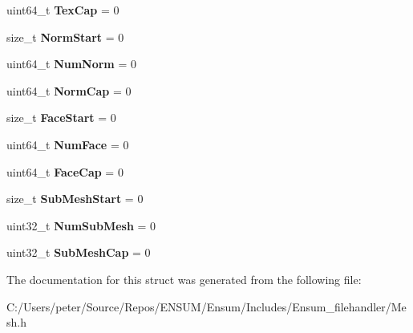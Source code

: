 \begin{DoxyCompactItemize}
\item 
uint64\+\_\+t {\bfseries Tex\+Cap} = 0\hypertarget{struct_ensum_1_1_file_handler_1_1_data_af059fdca4c5e605469d24a352457836b}{}\label{struct_ensum_1_1_file_handler_1_1_data_af059fdca4c5e605469d24a352457836b}

\item 
size\+\_\+t {\bfseries Norm\+Start} = 0\hypertarget{struct_ensum_1_1_file_handler_1_1_data_a21e21a6140afcd63a863e1bba14af522}{}\label{struct_ensum_1_1_file_handler_1_1_data_a21e21a6140afcd63a863e1bba14af522}

\item 
uint64\+\_\+t {\bfseries Num\+Norm} = 0\hypertarget{struct_ensum_1_1_file_handler_1_1_data_ae77b523ff54c96e5629333055448d3f1}{}\label{struct_ensum_1_1_file_handler_1_1_data_ae77b523ff54c96e5629333055448d3f1}

\item 
uint64\+\_\+t {\bfseries Norm\+Cap} = 0\hypertarget{struct_ensum_1_1_file_handler_1_1_data_aa96045841a19dbd3ac8736a5e880cf5a}{}\label{struct_ensum_1_1_file_handler_1_1_data_aa96045841a19dbd3ac8736a5e880cf5a}

\item 
size\+\_\+t {\bfseries Face\+Start} = 0\hypertarget{struct_ensum_1_1_file_handler_1_1_data_a45d3e0eaf6fd5ad49af3fdbd6657b833}{}\label{struct_ensum_1_1_file_handler_1_1_data_a45d3e0eaf6fd5ad49af3fdbd6657b833}

\item 
uint64\+\_\+t {\bfseries Num\+Face} = 0\hypertarget{struct_ensum_1_1_file_handler_1_1_data_a3632d1f001f1fc2b5ecf5292cd8718c2}{}\label{struct_ensum_1_1_file_handler_1_1_data_a3632d1f001f1fc2b5ecf5292cd8718c2}

\item 
uint64\+\_\+t {\bfseries Face\+Cap} = 0\hypertarget{struct_ensum_1_1_file_handler_1_1_data_a87c890385fe815e43118ec0d1ab24b42}{}\label{struct_ensum_1_1_file_handler_1_1_data_a87c890385fe815e43118ec0d1ab24b42}

\item 
size\+\_\+t {\bfseries Sub\+Mesh\+Start} = 0\hypertarget{struct_ensum_1_1_file_handler_1_1_data_aa6fdc83dbb873fdf3b74bc8c4b34ece5}{}\label{struct_ensum_1_1_file_handler_1_1_data_aa6fdc83dbb873fdf3b74bc8c4b34ece5}

\item 
uint32\+\_\+t {\bfseries Num\+Sub\+Mesh} = 0\hypertarget{struct_ensum_1_1_file_handler_1_1_data_a9fda99de4f97623374cb5f4a79cedcc6}{}\label{struct_ensum_1_1_file_handler_1_1_data_a9fda99de4f97623374cb5f4a79cedcc6}

\item 
uint32\+\_\+t {\bfseries Sub\+Mesh\+Cap} = 0\hypertarget{struct_ensum_1_1_file_handler_1_1_data_a5fb1c6b9abce4ac3453a77d1558db839}{}\label{struct_ensum_1_1_file_handler_1_1_data_a5fb1c6b9abce4ac3453a77d1558db839}

\end{DoxyCompactItemize}


The documentation for this struct was generated from the following file\+:\begin{DoxyCompactItemize}
\item 
C\+:/\+Users/peter/\+Source/\+Repos/\+E\+N\+S\+U\+M/\+Ensum/\+Includes/\+Ensum\+\_\+filehandler/Mesh.\+h\end{DoxyCompactItemize}
